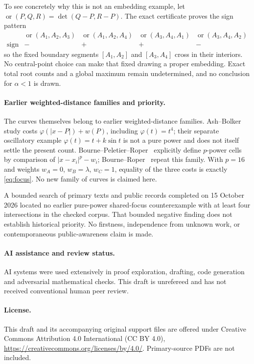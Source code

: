 \documentclass[11pt]{article}
\newcommand{\detv}[2]{\det(#1,#2)}
\begin{document}
To see concretely why this is not an embedding example, let
$\operatorname{or}(P,Q,R)=\detv{Q-P}{R-P}$. The exact certificate proves the sign pattern
\[
\begin{array}{c|cccc}
 &\operatorname{or}(A_1,A_2,A_3)&\operatorname{or}(A_1,A_2,A_4)&
 \operatorname{or}(A_3,A_4,A_1)&\operatorname{or}(A_3,A_4,A_2)\\\hline
 \text{sign}&-&+&+&-
\end{array}
\]
so the fixed boundary segments $[A_1,A_2]$ and $[A_3,A_4]$ cross in their interiors. No central-point choice can make that fixed drawing a proper embedding. Exact total root counts and a global maximum remain undetermined, and no conclusion for $\alpha<1$ is drawn.

\paragraph{Earlier weighted-distance families and priority.}
The curves themselves belong to earlier weighted-distance families. Ash--Bolker~\cite{AB} study costs $\varphi(|x-P|)+w(P)$, including $\varphi(t)=t^4$; their separate oscillatory example $\varphi(t)=t+k\sin t$ is not a pure power and does not itself settle the present count. Bourne--Peletier--Roper~\cite[Definition~4.12 in the author manuscript]{BPR} explicitly define $p$-power cells by comparison of $|x-x_i|^p-w_i$; Bourne--Roper~\cite[Section~5, p.~2568]{BR} repeat this family. With $p=16$ and weights $w_A=0$, $w_B=\lambda$, $w_C=1$, equality of the three costs is exactly \eqref{eq:focus}. No new family of curves is claimed here.

A bounded search of primary texts and public records completed on 15 October 2026 located no earlier pure-power shared-focus counterexample with at least four intersections in the checked corpus. That bounded negative finding does not establish historical priority. No firstness, independence from unknown work, or contemporaneous public-awareness claim is made.

\paragraph{AI assistance and review status.}
AI systems were used extensively in proof exploration, drafting, code generation and adversarial mathematical checks. This draft is unrefereed and has not received conventional human peer review.

\paragraph{License.}
This draft and its accompanying original support files are offered under Creative Commons Attribution 4.0 International (CC BY 4.0), \url{https://creativecommons.org/licenses/by/4.0/}. Primary-source PDFs are not included.
\end{document}
